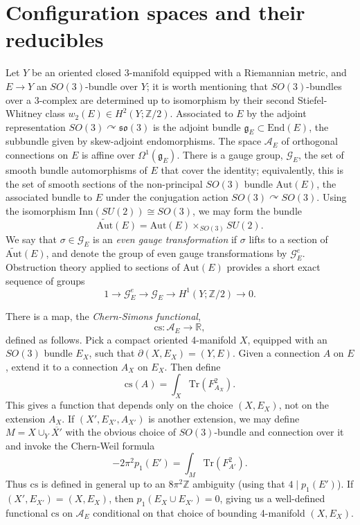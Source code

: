 \documentclass[10pt,a4paper]{amsart}
\newcounter{qchap}
\newcommand{\qchapter}[1]{\refstepcounter{qchap}\setcounter{section}{0}\setcounter{equation}{0}\setcounter{theorem}{0}\renewcommand{\thesection}{\theqchap.\arabic{section}}\renewcommand{\theequation}{\theqchap.\arabic{equation}}\section*{#1}}
\newcommand{\chapter}[1]{\qchapter{#1}}
\theoremstyle{definition}
\theoremstyle{remark}
\numberwithin{figure}{qchap}
\begin{document}
\chapter{Configuration spaces and their reducibles}\label{chap:2}
Let $Y$ be an oriented closed 3-manifold equipped with a Riemannian metric, and $E \to Y$ an $SO(3)$-bundle over $Y$; it is worth mentioning that $SO(3)$-bundles over a 3-complex are determined up to isomorphism by their second Stiefel-Whitney class $w_2(E) \in H^2(Y;\mathbb Z/2)$. Associated to $E$ by the adjoint representation $SO(3) \curvearrowright \mathfrak{so}(3)$ is the adjoint bundle $\mathfrak g_E \subset \text{End}(E)$, the subbundle given by skew-adjoint endomorphisms. The space $\mathcal A_E$ of orthogonal connections on $E$ is affine over $\Omega^1(\mathfrak g_E)$. There is a gauge group, $\mathcal G_E$, the set of smooth bundle automorphisms of $E$ that cover the identity; equivalently, this is the set of smooth sections of the non-principal $SO(3)$ bundle $\text{Aut}(E)$, the associated bundle to $E$ under the conjugation action $SO(3) \curvearrowright SO(3)$. Using the isomorphism $\text{Inn}(SU(2)) \cong SO(3)$, we may form the bundle $$\widetilde{\text{Aut}}(E) = \text{Aut}(E) \times_{SO(3)} SU(2).$$ We say that $\sigma \in \mathcal G_E$ is an \textit{even gauge transformation} if $\sigma$ lifts to a section of $\widetilde{\text{Aut}}(E)$, and denote the group of even gauge transformations by $\mathcal G^e_E$. Obstruction theory applied to sections of $\text{Aut}(E)$ provides a short exact sequence of groups $$1 \to \mathcal G^e_E \to \mathcal G_E \to H^1(Y;\mathbb Z/2) \to 0.$$

There is a map, the \textit{Chern-Simons functional}, $$\text{cs}: \mathcal A_E \to \mathbb R,$$ defined as follows. Pick a compact oriented 4-manifold $X$, equipped with an $SO(3)$ bundle $E_X$, such that $\partial(X,E_X) = (Y,E)$. Given a connection $A$ on $E$, extend it to a connection $A_X$ on $E_X$. Then define $$\text{cs}(A) = \int_X \text{Tr}(F_{A_X}^2).$$ This gives a function that depends only on the choice $(X,E_X)$, not on the extension $A_X$. If $(X',E_{X'},A_{X'})$ is another extension, we may define $M = X \cup_Y \overline{X'}$ with the obvious choice of $SO(3)$-bundle and connection over it and invoke the Chern-Weil formula $$-2 \pi^2 p_1(E') = \int_M \text{Tr}(F_{A'}^2).$$ Thus $\text{cs}$ is defined in general up to an $8\pi^2 \mathbb Z$ ambiguity (using that $4 \mid p_1(E')$). If $(X', E_{X'}) = (X, E_X)$, then $p_1(E_X \cup E_{X'}) = 0$, giving us a well-defined functional $\text{cs}$ on $\mathcal A_E$ conditional on that choice of bounding 4-manifold $(X, E_X)$.
\end{document}
